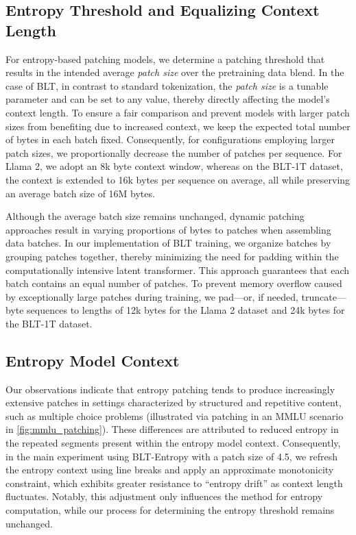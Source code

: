 \subsection{Entropy Threshold and Equalizing Context Length} For entropy-based patching models, we determine a patching threshold that results in the intended average \textit{patch size} over the pretraining data blend. In the case of {\textsc BLT}, in contrast to standard tokenization, the \textit{patch size} is a tunable parameter and can be set to any value, thereby directly affecting the model’s context length. To ensure a fair comparison and prevent models with larger patch sizes from benefiting due to increased context, we keep the expected total number of bytes in each batch fixed. Consequently, for configurations employing larger patch sizes, we proportionally decrease the number of patches per sequence. For Llama 2, we adopt an 8k byte context window, whereas on the {\textsc BLT}-1T dataset, the context is extended to 16k bytes per sequence on average, all while preserving an average batch size of 16M bytes.

Although the average batch size remains unchanged, dynamic patching approaches result in varying proportions of bytes to patches when assembling data batches. In our implementation of {\textsc BLT} training, we organize batches by grouping patches together, thereby minimizing the need for padding within the computationally intensive latent transformer. This approach guarantees that each batch contains an equal number of patches. To prevent memory overflow caused by exceptionally large patches during training, we pad—or, if needed, truncate—byte sequences to lengths of 12k bytes for the Llama 2 dataset and 24k bytes for the {\textsc BLT}-1T dataset.

\subsection{Entropy Model Context}
\label{section:entropy-context}
Our observations indicate that entropy patching tends to produce increasingly extensive patches in settings characterized by structured and repetitive content, such as multiple choice problems (illustrated via patching in an MMLU scenario in \autoref{fig:mmlu_patching}). These differences are attributed to reduced entropy in the repeated segments present within the entropy model context. Consequently, in the main experiment using {\textsc BLT}-Entropy with a patch size of 4.5, we refresh the entropy context using line breaks and apply an approximate monotonicity constraint, which exhibits greater resistance to “entropy drift” as context length fluctuates. Notably, this adjustment only influences the method for entropy computation, while our process for determining the entropy threshold remains unchanged.

